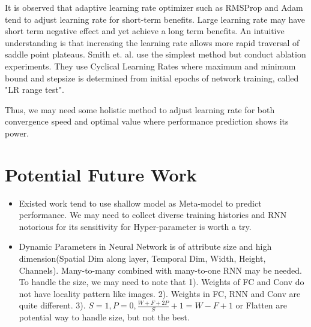 \documentclass{mcmthesis}
\begin{document}
It is observed \cite{smith2017cyclical} that adaptive learning rate optimizer such as RMSProp and Adam tend to adjust learning rate for short-term benefits. Large learning rate may have short term negative effect and yet achieve a long term benefits. An intuitive understanding is that increasing the learning rate allows more
rapid traversal of saddle point plateaus.  Smith et. al. \cite{smith2017cyclical} use the simplest method but conduct ablation experiments. They use Cyclical Learning Rates where maximum and minimum bound and stepsize is determined from initial epochs of network training, called "LR range test". 

Thus, we may need some holistic method to adjust learning rate for both convergence speed and optimal value where performance prediction  shows its power. 

\section{Potential Future Work}
\begin{itemize}[noitemsep]
	\item Existed work tend to use shallow model as Meta-model to predict performance. We may need to collect diverse training histories and RNN notorious for its sensitivity for Hyper-parameter is worth a try. 
	\item Dynamic Parameters in Neural Network is of attribute size and high dimension(Spatial Dim along layer, Temporal Dim, Width, Height, Channels). Many-to-many combined with many-to-one RNN may be needed. To handle the size, we may need to note that 1). Weights of FC and Conv do not have locality pattern like images. 2). Weights in FC, RNN and Conv are quite different.   3). $S=1,P=0,\frac{W+F+2P}{S}+1=W-F+1$ or Flatten are potential way to handle size, but not the best. 
\end{itemize}



	
\end{document}
